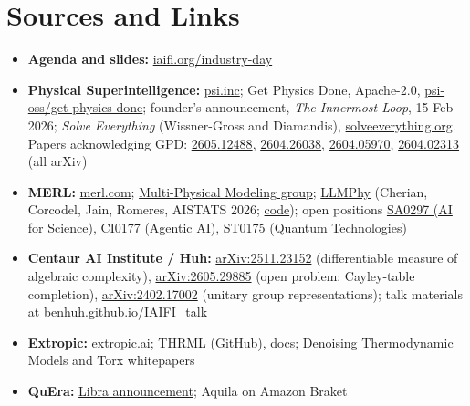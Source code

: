 \documentclass[11pt]{article}
\begin{document}
\section*{Sources and Links}

\begingroup
\sloppy
\begin{itemize}[leftmargin=*]
    \item \textbf{Agenda and slides:} \href{https://iaifi.org/industry-day}{iaifi.org/industry-day}
    \item \textbf{Physical Superintelligence:} \href{https://www.psi.inc/}{psi.inc}; Get Physics Done, Apache-2.0, \href{https://github.com/psi-oss/get-physics-done}{psi-oss/get-physics-done}; founder's announcement, \emph{The Innermost Loop}, 15 Feb 2026; \emph{Solve Everything} (Wissner-Gross and Diamandis), \href{https://solveeverything.org/}{solveeverything.org}\@. Papers acknowledging GPD: \href{https://arxiv.org/abs/2605.12488}{2605.12488}, \href{https://arxiv.org/abs/2604.26038}{2604.26038}, \href{https://arxiv.org/abs/2604.05970}{2604.05970}, \href{https://arxiv.org/abs/2604.02313}{2604.02313} (all arXiv)
    \item \textbf{MERL:} \href{https://www.merl.com/}{merl.com}; \href{https://www.merl.com/research/multi-physical-modeling}{Multi-Physical Modeling group}; \href{https://www.merl.com/research/highlights/LLMPhy}{LLMPhy} (Cherian, Corcodel, Jain, Romeres, AISTATS 2026; \href{https://github.com/merlresearch/llmphy}{code}); open positions \href{https://www.merl.com/employment/employment}{SA0297 (AI for Science)}, CI0177 (Agentic AI), ST0175 (Quantum Technologies)
    \item \textbf{Centaur AI Institute / Huh:} \href{https://arxiv.org/abs/2511.23152}{arXiv:2511.23152} (differentiable measure of algebraic complexity), \href{https://arxiv.org/abs/2605.29885}{arXiv:2605.29885} (open problem: Cayley-table completion), \href{https://arxiv.org/abs/2402.17002}{arXiv:2402.17002} (unitary group representations); talk materials at \href{https://benhuh.github.io/IAIFI_talk/}{benhuh.github.io/IAIFI\_talk}
    \item \textbf{Extropic:} \href{https://extropic.ai/software}{extropic.ai}; THRML \href{https://github.com/extropic-ai/thrml}{(GitHub)}, \href{https://docs.thrml.ai/}{docs}; Denoising Thermodynamic Models and Torx whitepapers
    \item \textbf{QuEra:} \href{https://www.quera.com/press-releases/quera-announces-2028-fault-tolerant-quantum-computer-and-expanded-multi-year-strategic-collaboration-with-aws}{Libra announcement}; Aquila on Amazon Braket

\end{itemize}
\end{document}
